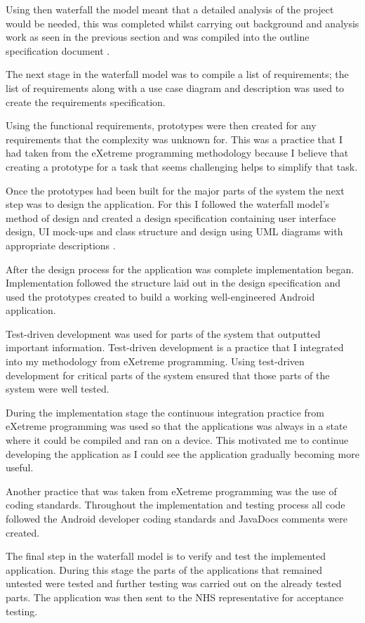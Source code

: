 Using then waterfall the model meant that a detailed analysis of the project would be needed, this was completed whilst carrying out background and analysis work as seen in the previous section and was compiled into the outline specification document \cite{waterfall}.

The next stage in the waterfall model was to compile a list of requirements; the list of requirements along with a use case diagram and description was used to create the requirements specification.

Using the functional requirements, prototypes were then created for any requirements that the complexity was unknown for. This was a practice that I had taken from the eXetreme programming methodology because I believe that creating a prototype for a task that seems challenging helps to simplify that task.

Once the prototypes had been built for the major parts of the system the next step was to design the application. For this I followed the waterfall model’s method of design and created a design specification containing user interface design, UI mock-ups and class structure and design using UML diagrams with appropriate descriptions \cite{waterfall}. 

After the design process for the application was complete implementation began. Implementation followed the structure laid out in the design specification and used the prototypes created to build a working well-engineered Android application.

Test-driven development was used for parts of the system that outputted important information. Test-driven development is a practice that I integrated into my methodology from eXetreme programming. Using test-driven development for critical parts of the system ensured that those parts of the system were well tested.

During the implementation stage the continuous integration practice from eXetreme programming was used so that the applications was always in a state where it could be compiled and ran on a device. This motivated me to continue developing the application as I could see the application gradually becoming more useful.

Another practice that was taken from eXetreme programming \cite{xp} was the use of coding standards. Throughout the implementation and testing process all code followed the Android developer coding standards and JavaDocs comments were created.

The final step in the waterfall model \cite{waterfall} is to verify and test the implemented application. During this stage the parts of the applications that remained untested were tested and further testing was carried out on the already tested parts. The application was then sent to the NHS representative for acceptance testing.

